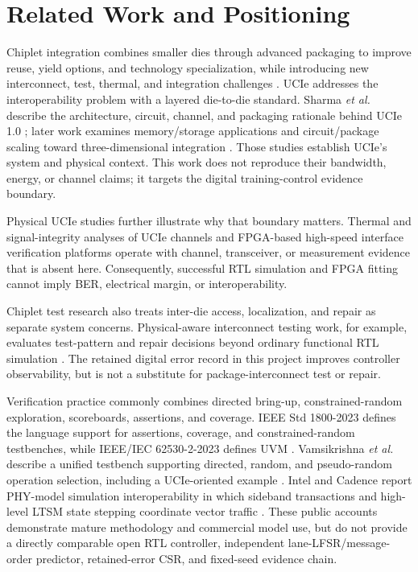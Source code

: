 \section{Related Work and Positioning}
\label{sec:related}

Chiplet integration combines smaller dies through advanced packaging to improve
reuse, yield options, and technology specialization, while introducing new
interconnect, test, thermal, and integration challenges
\cite{li2020chiplet,lau2021chiplets,mahajan2019emib}. UCIe addresses the interoperability
problem with a layered die-to-die standard. Sharma \emph{et al.} describe the
architecture, circuit, channel, and packaging rationale behind UCIe 1.0
\cite{sharma2022ucie,sharma2023sop}; later work examines memory/storage applications
\cite{sharma2024memory} and circuit/package scaling toward three-dimensional
integration \cite{nature2024ucie3d}. Those studies establish UCIe's system and
physical context. This work does not reproduce their bandwidth, energy, or
channel claims; it targets the digital training-control evidence boundary.

Physical UCIe studies further illustrate why that boundary matters. Thermal and
signal-integrity analyses of UCIe channels
\cite{son2023thermal,shin2023signal} and
FPGA-based high-speed interface verification platforms \cite{chang2022fpga}
operate with channel, transceiver, or measurement evidence that is absent here.
Consequently, successful RTL simulation and FPGA fitting cannot imply BER,
electrical margin, or interoperability.

Chiplet test research also treats inter-die access, localization, and repair as
separate system concerns. Physical-aware interconnect testing work, for
example, evaluates test-pattern and repair decisions beyond ordinary
functional RTL simulation \cite{cui2023physical}. The retained digital error
record in this project improves controller observability, but is not a
substitute for package-interconnect test or repair.

Verification practice commonly combines directed bring-up, constrained-random
exploration, scoreboards, assertions, and coverage. IEEE Std 1800-2023 defines
the language support for assertions, coverage, and constrained-random
testbenches, while IEEE/IEC 62530-2-2023 defines UVM
\cite{ieee1800_2023,ieee62530_2}. Vamsikrishna \emph{et al.} describe a unified
testbench supporting directed, random, and pseudo-random operation selection,
including a UCIe-oriented example \cite{vamsi2025unified}. Intel and Cadence
report PHY-model simulation interoperability in which sideband transactions and
high-level LTSM state stepping coordinate vector traffic
\cite{cadenceIntelUcie}. These public accounts demonstrate mature methodology
and commercial model use, but do not provide a directly comparable open RTL
controller, independent lane-LFSR/message-order predictor, retained-error CSR,
and fixed-seed evidence chain.


